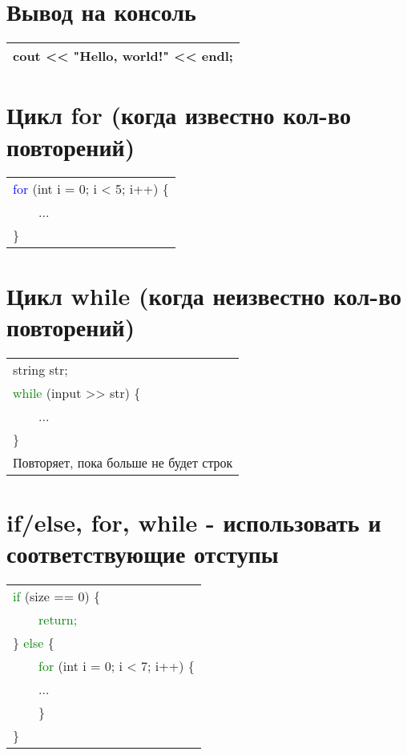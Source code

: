 \documentclass[12pt, letterpaper]{article}
\begin{document}
\section{Вывод на консоль}
\begin{flushleft}
\begin{tabular}{ |l| } 
\hline
cout << "Hello, world!" << endl;\\
\hline
\end{tabular}
\end{flushleft}
\section{Цикл for (когда известно кол-во повторений)}
\begin{flushleft}
\begin{tabular}{ |l| } 
\hline
\textcolor{blue}{for }(int i = 0; i < 5; i++) \{\\
\ \ \ \ ...\\
\}\\
\hline
\end{tabular}
\end{flushleft}
\section{Цикл while (когда неизвестно кол-во повторений)}
\begin{flushleft}
\begin{tabular}{ |l| } 
\hline
string str;\\
\textcolor{green}{while } (input >> str) \{\\
\ \ \ \ ...\\
\}\\
Повторяет, пока больше не будет строк\\
\hline
\end{tabular}
\end{flushleft}

\section{if/else, for, while - использовать {} и соответствующие отступы}
\begin{flushleft}
\begin{tabular}{ |l| } 
\hline
\textcolor{green}{if }(size == 0) \{\\
\ \ \ \ \textcolor{green}{return;}\\
\} \textcolor{green}{else } \{\\
\ \ \ \ \textcolor{green}{for }(int i = 0; i < 7; i++) \{\\
\ \ \ \ ...\\
\ \ \ \ \}\\
\}\\
\hline
\end{tabular}
\end{flushleft}
\end{document}
